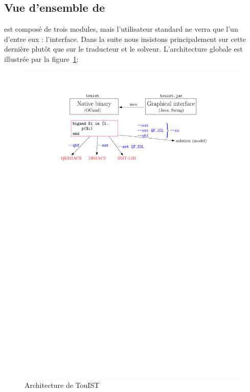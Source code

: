 \subsection{Vue d'ensemble de \touist}\label{sec:sat_interface}

\touist est composé de trois modules, mais l'utilisateur standard ne verra que l'un d'entre eux : l'interface. Dans la suite nous insistons principalement sur cette dernière plutôt que sur le traducteur et le solveur. L'architecture globale est illustrée par la figure~\ref{fig:architectureTouisT}:

\begin{figure}[htbp]
\centering
  \includegraphics[scale=0.80]{figures/architecture.pdf}
  \caption{Architecture de TouIST}
  \label{fig:architectureTouisT}
\end{figure}


